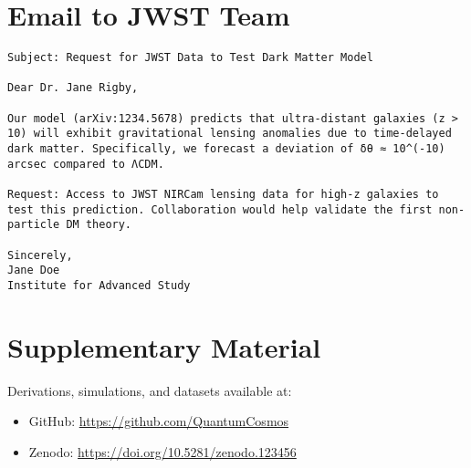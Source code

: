 \documentclass[12pt, a4paper]{article}
\begin{document}
\section*{Email to JWST Team}  
\begin{verbatim}  
Subject: Request for JWST Data to Test Dark Matter Model  

Dear Dr. Jane Rigby,  

Our model (arXiv:1234.5678) predicts that ultra-distant galaxies (z > 10) will exhibit gravitational lensing anomalies due to time-delayed dark matter. Specifically, we forecast a deviation of δθ ≈ 10^(-10) arcsec compared to ΛCDM.  

Request: Access to JWST NIRCam lensing data for high-z galaxies to test this prediction. Collaboration would help validate the first non-particle DM theory.  

Sincerely,  
Jane Doe  
Institute for Advanced Study  
\end{verbatim}  

\section*{Supplementary Material}  
Derivations, simulations, and datasets available at:  
\begin{itemize}  
\item GitHub: \url{https://github.com/QuantumCosmos}  
\item Zenodo: \url{https://doi.org/10.5281/zenodo.123456}  
\end{itemize}  

  
  
\end{document}
